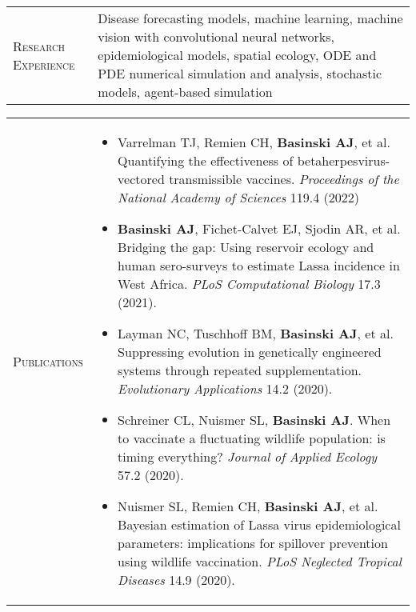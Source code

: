 \documentclass[11pt]{article}
\newcommand{\cellone}{3.5cm} %
\newcommand{\celltwo}{11cm}
\newcommand{\spa}{\vspace{.4in}}
\begin{document}
\spa

\begin{tabularx}{\textwidth}{p{\cellone} p{\celltwo}}
  \parbox[t][0cm]{\cellone}{R\textsc{esearch} E\textsc{xperience}} & \parbox[t][0cm]{12cm}{
    Disease forecasting models, machine learning, machine vision with convolutional neural networks, epidemiological models, spatial ecology, ODE and PDE numerical simulation and analysis, stochastic models, agent-based simulation}
\end{tabularx}

\spa
\spa

\begin{tabularx}{\textwidth}{p{\cellone} p{\celltwo}}
  \parbox[t][0cm]{\cellone}{P\textsc{ublications}} &  \parbox[t][0cm]{12cm}{ 

    \vspace{-0.65cm}
    \begin{itemize}
      
    \item Varrelman TJ, Remien CH, {\bf Basinski AJ}, et al.
      Quantifying the effectiveness of betaherpesvirus-vectored
      transmissible vaccines. \emph{Proceedings of the National Academy of
        Sciences} 119.4 (2022)
      
    \item {\bf Basinski AJ}, Fichet-Calvet EJ, Sjodin AR, et
      al. Bridging the gap: Using reservoir ecology and human
      sero-surveys to estimate Lassa incidence in West
      Africa. \emph{PLoS Computational Biology} 17.3 (2021).

      \vspace{0.05in}      

    \item Layman NC, Tuschhoff BM, {\bf Basinski AJ}, et
      al. Suppressing evolution in genetically engineered systems
      through repeated supplementation. \emph{Evolutionary
      Applications} 14.2 (2020).
      
      \vspace{0.05in}
      
    \item Schreiner CL, Nuismer SL, {\bf Basinski AJ}. When to
      vaccinate a fluctuating wildlife population: is timing
      everything? \emph{Journal of Applied Ecology} 57.2 (2020).

      \vspace{0.05in}      
      
    \item Nuismer SL, Remien CH, {\bf Basinski AJ}, et al. Bayesian
      estimation of Lassa virus epidemiological parameters:
      implications for spillover prevention using wildlife
      vaccination. \emph{PLoS Neglected Tropical Diseases} 14.9
      (2020).
      
    \end{itemize}
  }
\end{tabularx}
\end{document}
